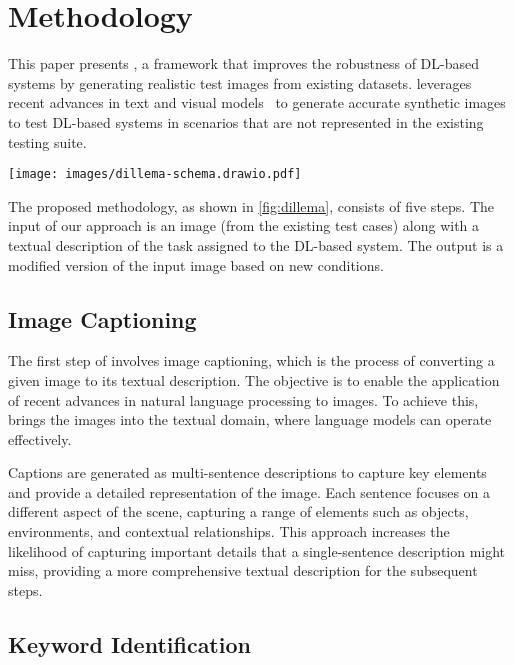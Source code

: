 \section{Methodology}
\label{sec:solution}

This paper presents \approach, a framework that improves the robustness of DL-based systems by generating realistic test images from existing datasets.
\approach leverages recent advances in text and visual models~\cite{DBLP:conf/cvpr/RombachBLEO22} to generate accurate synthetic images to test DL-based systems in scenarios that are not represented in the existing testing suite.

\begin{figure*}
    \centering
    \texttt{[image: images/dillema-schema.drawio.pdf]}
    \caption{\approach.}
    \label{fig:dillema}
    \vspace{-6mm}
\end{figure*}

The proposed methodology, as shown in \autoref{fig:dillema}, consists of five steps.
The input of our approach is an image (from the existing test cases) along with a textual description of the task assigned to the DL-based system. The output is a modified version of the input image based on new conditions. 

\subsection{Image Captioning}

The first step of \approach involves image captioning, which is the process of converting a given image to its textual description. The objective is to enable the application of recent advances in natural language processing to images. To achieve this, \approach brings the images into the textual domain, where language models can operate effectively.

Captions are generated as multi-sentence descriptions to capture key elements and provide a detailed representation of the image. Each sentence focuses on a different aspect of the scene, capturing a range of elements such as objects, environments, and contextual relationships. This approach increases the likelihood of capturing important details that a single-sentence description might miss, providing a more comprehensive textual description for the subsequent steps.

\subsection{Keyword Identification}

